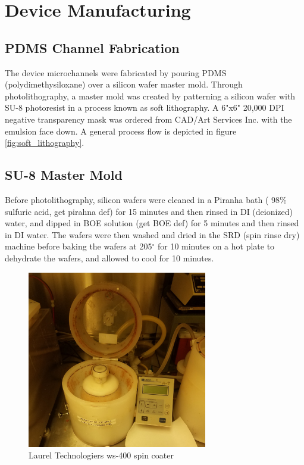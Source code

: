 
\section{Device Manufacturing}

\subsection{PDMS Channel Fabrication}
\par The device microchannels were fabricated by pouring PDMS (polydimethysiloxane) over a silicon wafer master mold. Through photolithography, a master mold was created by patterning a silicon wafer with SU-8 photoresist in  a process known as soft lithography. A 6"x6" 20,000 DPI negative transparency mask was ordered from CAD/Art Services Inc. with the emulsion face down. A general process flow is depicted in figure \ref{fig:soft_lithography}.


\subsection*{SU-8 Master Mold}

\par Before photolithography, silicon wafers were cleaned in a Piranha bath ( 98\% sulfuric acid, get pirahna def) for 15 minutes and then rinsed in DI (deionized) water, and dipped in BOE solution (get BOE def) for 5 minutes and then rinsed in DI water. The wafers were then washed and dried in the SRD (spin rinse dry) machine before baking the wafers at 205$^\circ$ for 10 minutes on a hot plate to dehydrate the wafers, and allowed to cool for 10 minutes. 

\begin{figure}[h]
    \centering
    \includegraphics[width=0.7\textwidth]{images/resist_spinner_open.jpg}
    \caption{Laurel Technologiers ws-400 spin coater}
    \label{fig:spin_coater}
\end{figure}

